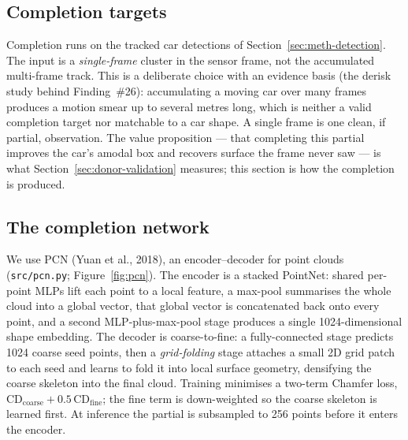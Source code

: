 \subsection{Completion targets}
\label{sec:completion-what}

Completion runs on the tracked car detections of Section~\ref{sec:meth-detection}. The input is a
\emph{single-frame} cluster in the sensor frame, not the accumulated multi-frame
track. This is a deliberate choice with an evidence basis (the derisk study
behind Finding~\#26): accumulating a moving car over many frames produces a
motion smear up to several metres long, which is neither a valid completion
target nor matchable to a car shape. A single frame is one clean, if partial,
observation. The value proposition --- that completing this partial improves the
car's amodal box and recovers surface the frame never saw --- is what Section~\ref{sec:donor-validation}
measures; this section is how the completion is produced.

\subsection{The completion network}
\label{sec:completion-pcn}

We use PCN (Yuan et al., 2018), an encoder--decoder for point clouds
(\texttt{src/pcn.py}; Figure~\ref{fig:pcn}). The encoder is a stacked PointNet: shared per-point MLPs
lift each point to a local feature, a max-pool summarises the whole cloud into a
global vector, that global vector is concatenated back onto every point, and a
second MLP-plus-max-pool stage produces a single \num{1024}-dimensional shape
embedding. The decoder is coarse-to-fine: a fully-connected stage predicts
\num{1024} coarse seed points, then a \emph{grid-folding} stage attaches a small
2D grid patch to each seed and learns to fold it into local surface geometry,
densifying the coarse skeleton into the final cloud. Training minimises a
two-term Chamfer loss, $\mathrm{CD}_{\text{coarse}} + 0.5\,\mathrm{CD}_{\text{fine}}$;
the fine term is down-weighted so the coarse skeleton is learned first. At
inference the partial is subsampled to \num{256} points before it enters the
encoder.

